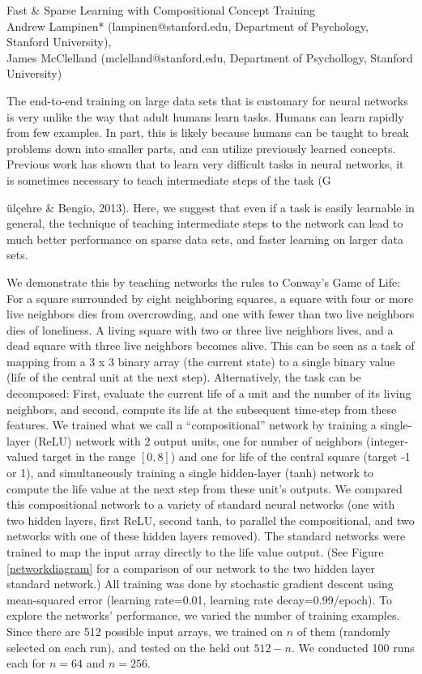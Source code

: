 \documentclass[10pt]{article}
\begin{document}
\begingroup  
  \centering
  \large Fast \& Sparse Learning with Compositional Concept Training\\[1em]
  \small{Andrew Lampinen* (lampinen@stanford.edu, Department of Psychology, Stanford University),\\ James McClelland (mclelland@stanford.edu, Department of Psychollogy, Stanford University)}\par
\endgroup
\vspace{10pt}
The end-to-end training on large data sets that is customary for neural networks is very unlike the way that adult humans learn tasks. Humans can learn rapidly from few examples. In part, this is likely because humans can be taught to break problems down into smaller parts, and can utilize previously learned concepts. Previous work has shown that to learn very difficult tasks in neural networks, it is sometimes necessary to teach intermediate steps of the task (G{\"{u}l\c{c}ehre \& Bengio, 2013). Here, we suggest that even if a task is easily learnable in general, the technique of teaching intermediate steps to the network can lead to much better performance on sparse data sets, and faster learning on larger data sets.\par
We demonstrate this by teaching networks the rules to Conway's Game of Life: For a square surrounded by eight neighboring squares, a square with four or more live neighbors dies from overcrowding, and one with fewer than two live neighbors dies of loneliness. A living square with two or three live neighbors lives, and a dead square with three live neighbors becomes alive. This can be seen as a task of mapping from a 3 x 3 binary array (the current state) to a single binary value (life of the central unit at the next step). Alternatively, the task can be decomposed: First, evaluate the current life of a unit and the number of its living neighbors, and second, compute its life at the subsequent time-step from these features. We trained what we call a ``compositional'' network by training a single-layer (ReLU) network with 2 output units, one for number of neighbors (integer-valued target in the range $[0,8]$) and one for life of the central square (target -1 or 1), and simultaneously training a single hidden-layer (tanh) network to compute the life value at the next step from these unit's outputs. We compared this compositional network to a variety of standard neural networks (one with two hidden layers, first ReLU, second tanh, to parallel the compositional, and two networks with one of these hidden layers removed). The standard networks were trained to map the input array directly to the life value output. (See Figure \ref{networkdiagram} for a comparison of our network to the two hidden layer standard network.) All training was done by stochastic gradient descent using mean-squared error (learning rate=0.01, learning rate decay=0.99/epoch). To explore the networks' performance, we varied the number of training examples. Since there are 512 possible input arrays, we trained on $n$ of them (randomly selected on each run), and tested on the held out $512-n$. We conducted 100 runs each for $n = 64$ and $n=256$.\par
}
\end{document}
